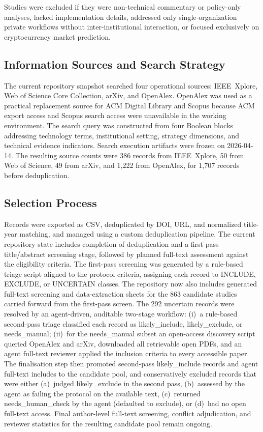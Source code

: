 \documentclass[journal]{IEEEtran}
\begin{document}
Studies were excluded if they were non-technical commentary or policy-only analyses, lacked implementation details, addressed only single-organization private workflows without inter-institutional interaction, or focused exclusively on cryptocurrency market prediction.

\subsection{Information Sources and Search Strategy}

The current repository snapshot searched four operational sources: IEEE~Xplore, Web of Science Core Collection, arXiv, and OpenAlex.
OpenAlex was used as a practical replacement source for ACM Digital Library and Scopus because ACM export access and Scopus search access were unavailable in the working environment.
The search query was constructed from four Boolean blocks addressing technology terms, institutional setting, strategy dimensions, and technical evidence indicators.
Search execution artifacts were frozen on 2026-04-14.
The resulting source counts were 386 records from IEEE~Xplore, 50 from Web of Science, 49 from arXiv, and 1,222 from OpenAlex, for 1,707 records before deduplication.

\subsection{Selection Process}

Records were exported as CSV, deduplicated by DOI, URL, and normalized title-year matching, and managed using a custom deduplication pipeline.
The current repository state includes completion of deduplication and a first-pass title/abstract screening stage, followed by planned full-text assessment against the eligibility criteria.
The first-pass screening was generated by a rule-based triage script aligned to the protocol criteria, assigning each record to INCLUDE, EXCLUDE, or UNCERTAIN classes.
The repository now also includes generated full-text screening and data-extraction sheets for the 863 candidate studies carried forward from the first-pass screen.
The 292 uncertain records were resolved by an agent-driven, auditable two-stage workflow: (i)~a rule-based second-pass triage classified each record as likely\_include, likely\_exclude, or needs\_manual; (ii)~for the needs\_manual subset an open-access discovery script queried OpenAlex and arXiv, downloaded all retrievable open PDFs, and an agent full-text reviewer applied the inclusion criteria to every accessible paper.
The finalisation step then promoted second-pass likely\_include records and agent full-text includes to the candidate pool, and conservatively excluded records that were either (a)~judged likely\_exclude in the second pass, (b)~assessed by the agent as failing the protocol on the available text, (c)~returned needs\_human\_check by the agent (defaulted to exclude), or (d)~had no open full-text access.
Final author-level full-text screening, conflict adjudication, and reviewer statistics for the resulting candidate pool remain ongoing.
\end{document}
